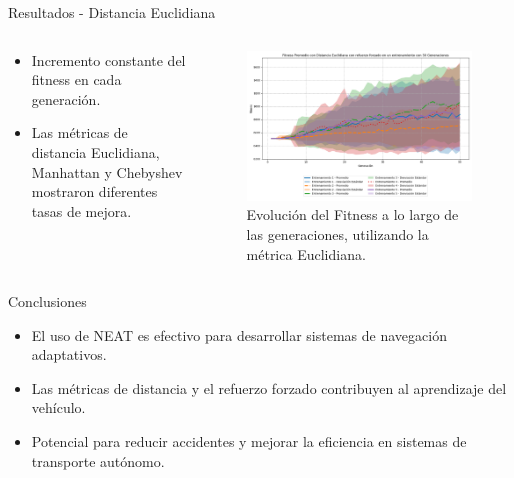 \documentclass{beamer}
\begin{document}
\begin{frame}{Resultados - Distancia Euclidiana}
    \begin{columns}[T]
        \begin{column}{0.6\textwidth}
            \begin{itemize}
                \item Incremento constante del fitness en cada generación.
                \item Las métricas de distancia Euclidiana, Manhattan y Chebyshev mostraron diferentes tasas de mejora.
            \end{itemize}
            
        \end{column}
        \begin{column}{0.5\textwidth}
            \begin{figure}
                \centering
                \includegraphics[width=\linewidth]{Euclidiana/Fitness_Acumulado_Eucli_50Gen.png}
                \caption{Evolución del Fitness a lo largo de las generaciones, utilizando la métrica Euclidiana.}
            \end{figure}
        \end{column}
    \end{columns}
\end{frame}



\begin{frame}{Conclusiones}
    \begin{itemize}
        \item El uso de NEAT es efectivo para desarrollar sistemas de navegación adaptativos.
        \item Las métricas de distancia y el refuerzo forzado contribuyen al aprendizaje del vehículo.
        \item Potencial para reducir accidentes y mejorar la eficiencia en sistemas de transporte autónomo.
    \end{itemize}
\end{frame}
\end{document}
